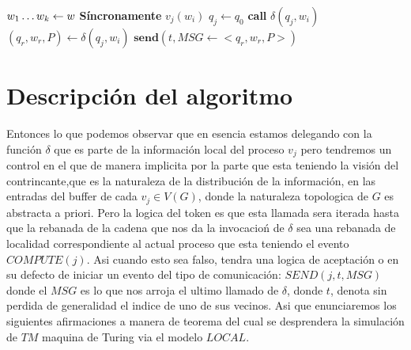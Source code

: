 \documentclass[10pt]{report}
\begin{document}
    \begin{algorithm}
        \caption{$Simula\char95Algo\char95TM(w)$}\label{simula}
        \begin{algorithmic}
            \STATE $w_{1}\mathellipsis w_{k} \gets w$
            \STATE \textbf{Síncronamente}
                  \STATE $v_{j}(w_{i})$
                  \STATE $q_{j}\gets q_{0}$
                     \STATE \textbf{call} $\delta(q_{j},w_{i})$
                     \STATE $(q_{r},w_{r},P)\gets \delta(q_{j},w_{i})$
                  \ENDWHILE
                  \ELSE
                     \STATE $\textbf{send}(t,MSG\gets<q_{r},w_{r},P>)$
                  \ENDIF
               \ENDFOR
        \end{algorithmic}
    \end{algorithm}
    \space
    \section{Descripción del algoritmo}\label{sec:descripción-del-algoritmo}
    Entonces lo que podemos observar que en esencia estamos delegando con la función $\delta$
    que es parte de la información local del proceso $v_{j}$ pero tendremos un control en el que de manera implicita
    por la parte que esta teniendo la visión del contrincante,que es la naturaleza de la distribución de la información,
    en las entradas del buffer de cada $v_{j}\in V(G)$, donde la naturaleza topologica de $G$ es abstracta a priori.
    Pero la logica del token es que esta llamada sera iterada hasta que la rebanada de la cadena que nos da la invocacioń
    de $\delta$ sea una rebanada de localidad correspondiente al actual proceso que esta teniendo el evento $COMPUTE(j)$.
    Asi cuando esto sea falso, tendra una logica de aceptación o en su defecto de iniciar un evento del tipo de
    comunicación: $SEND(j,t,MSG)$ donde el $MSG$ es lo que nos arroja el ultimo llamado de $\delta$, donde $t$, denota
    sin perdida de generalidad el indice de uno de sus vecinos.
    \space
    Asi que enunciaremos los siguientes afirmaciones a manera de teorema del cual se desprendera la simulación de $TM$
    maquina de Turing via el modelo $LOCAL$.\newpage
\end{document}
